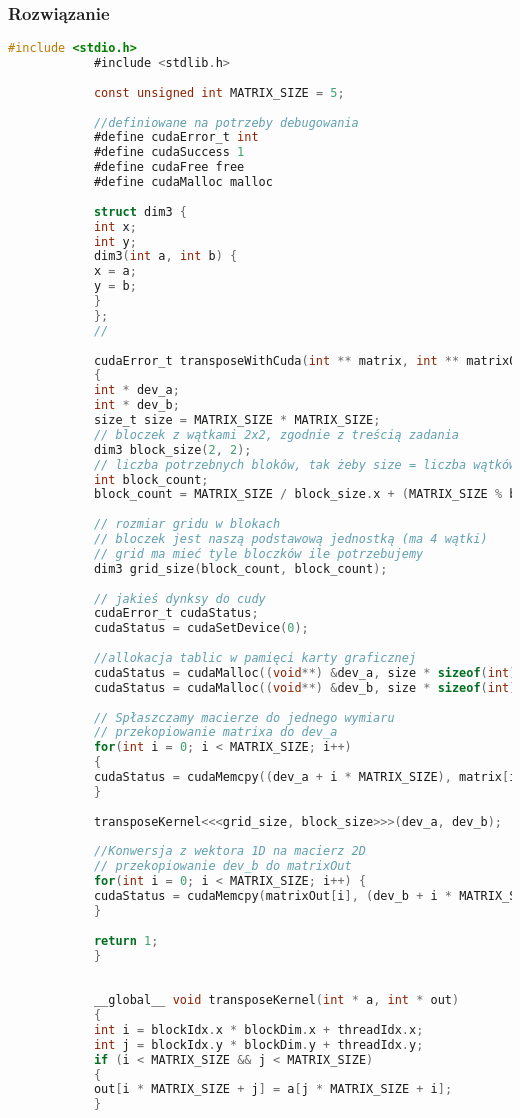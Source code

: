 		\subsubsection{Rozwiązanie}
			\begin{lstlisting}[language=C]
			#include <stdio.h>
			#include <stdlib.h>
			
			const unsigned int MATRIX_SIZE = 5;
			
			//definiowane na potrzeby debugowania
			#define cudaError_t int
			#define cudaSuccess 1
			#define cudaFree free
			#define cudaMalloc malloc
			
			struct dim3 {
			int x;
			int y;
			dim3(int a, int b) {
			x = a;
			y = b;
			}
			};
			//
			
			cudaError_t transposeWithCuda(int ** matrix, int ** matrixOut)
			{
			int * dev_a;
			int * dev_b;
			size_t size = MATRIX_SIZE * MATRIX_SIZE;
			// bloczek z wątkami 2x2, zgodnie z treścią zadania
			dim3 block_size(2, 2);
			// liczba potrzebnych bloków, tak żeby size = liczba wątków
			int block_count;
			block_count = MATRIX_SIZE / block_size.x + (MATRIX_SIZE % block_size.x == 0 ? 0 : 1);
			
			// rozmiar gridu w blokach
			// bloczek jest naszą podstawową jednostką (ma 4 wątki)
			// grid ma mieć tyle bloczków ile potrzebujemy
			dim3 grid_size(block_count, block_count);
			
			// jakieś dynksy do cudy
			cudaError_t cudaStatus;
			cudaStatus = cudaSetDevice(0);
			
			//allokacja tablic w pamięci karty graficznej
			cudaStatus = cudaMalloc((void**) &dev_a, size * sizeof(int));
			cudaStatus = cudaMalloc((void**) &dev_b, size * sizeof(int));
			
			// Spłaszczamy macierze do jednego wymiaru
			// przekopiowanie matrixa do dev_a
			for(int i = 0; i < MATRIX_SIZE; i++)
			{
			cudaStatus = cudaMemcpy((dev_a + i * MATRIX_SIZE), matrix[i], MATRIX_SIZE * sizeof(int), cudaMemcpyHostToDevice);
			}
			
			transposeKernel<<<grid_size, block_size>>>(dev_a, dev_b);
			
			//Konwersja z wektora 1D na macierz 2D
			// przekopiowanie dev_b do matrixOut
			for(int i = 0; i < MATRIX_SIZE; i++) {
			cudaStatus = cudaMemcpy(matrixOut[i], (dev_b + i * MATRIX_SIZE), MATRIX_SIZE * sizeof(int), cudaMemcpyDeviceToHost);
			}
			
			return 1;
			}
			
			
			__global__ void transposeKernel(int * a, int * out)
			{
			int i = blockIdx.x * blockDim.x + threadIdx.x;
			int j = blockIdx.y * blockDim.y + threadIdx.y;
			if (i < MATRIX_SIZE && j < MATRIX_SIZE)
			{
			out[i * MATRIX_SIZE + j] = a[j * MATRIX_SIZE + i];
			}
			

\end{lstlisting}
